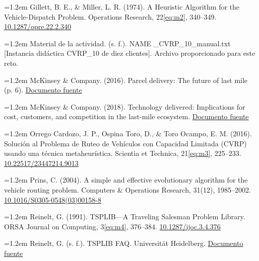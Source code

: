 \documentclass[11pt,a4paper]{article}
\numberwithin{equation}{section}
\begin{document}
{\small\hangindent=1.2em Gillett, B. E., \& Miller, L. R. (1974). A Heuristic Algorithm for the Vehicle-Dispatch Problem. Operations Research, 22\eqref{eq:m2}, 340--349. \href{https://doi.org/10.1287/opre.22.2.340}{10.1287/opre.22.2.340}\par}

{\small\hangindent=1.2em Material de la actividad. (s. f.). NAME \_CVRP\_10\_manual.txt [Instancia didáctica CVRP\_10 de diez clientes]. Archivo proporcionado para este reto.\par}

{\small\hangindent=1.2em McKinsey \& Company. (2016). Parcel delivery: The future of last mile (p. 6). \href{https://www.mckinsey.com/~/media/mckinsey/industries/travel\%20transport\%20and\%20logistics/our\%20insights/how\%20customer\%20demands\%20are\%20reshaping\%20last\%20mile\%20delivery/parcel_delivery_the_future_of_last_mile.pdf}{Documento fuente}\par}

{\small\hangindent=1.2em McKinsey \& Company. (2018). Technology delivered: Implications for cost, customers, and competition in the last-mile ecosystem. \href{https://www.mckinsey.com/industries/logistics/our-insights/technology-delivered-implications-for-cost-customers-and-competition-in-the-last-mile-ecosystem}{Documento fuente}\par}

{\small\hangindent=1.2em Orrego Cardozo, J. P., Ospina Toro, D., \& Toro Ocampo, E. M. (2016). Solución al Problema de Ruteo de Vehículos con Capacidad Limitada (CVRP) usando una técnica metaheurística. Scientia et Technica, 21\eqref{eq:m3}, 225--233. \href{https://doi.org/10.22517/23447214.9013}{10.22517/23447214.9013}\par}

{\small\hangindent=1.2em Prins, C. (2004). A simple and effective evolutionary algorithm for the vehicle routing problem. Computers \& Operations Research, 31(12), 1985--2002. \href{https://doi.org/10.1016/S0305-0548(03)00158-8}{10.1016/S0305-0548(03)00158-8}\par}

{\small\hangindent=1.2em Reinelt, G. (1991). TSPLIB---A Traveling Salesman Problem Library. ORSA Journal on Computing, 3\eqref{eq:m4}, 376--384. \href{https://doi.org/10.1287/ijoc.3.4.376}{10.1287/ijoc.3.4.376}\par}

{\small\hangindent=1.2em Reinelt, G. (s. f.). TSPLIB FAQ. Universität Heidelberg. \href{https://comopt.ifi.uni-heidelberg.de/software/TSPLIB95/tsp/TSPFAQ.html}{Documento fuente}\par}
\end{document}
